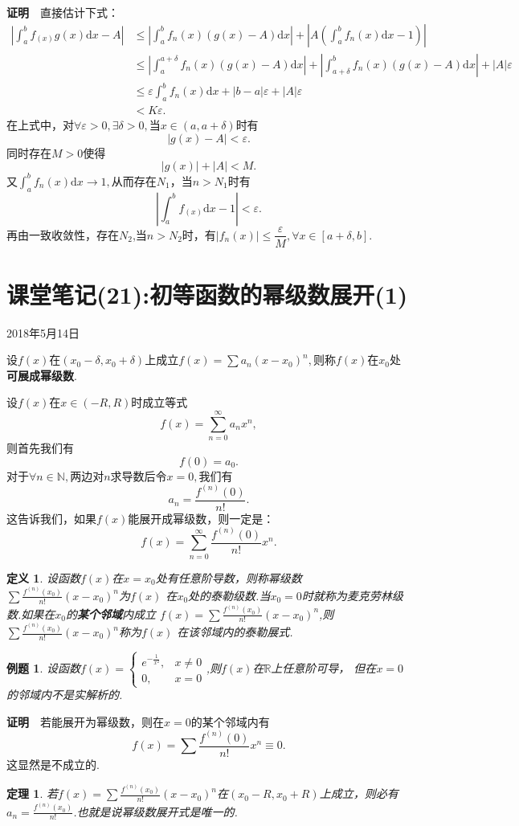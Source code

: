 \documentclass[UTF8]{article}
\newcommand{\R}{\mathbb{R}}
\newcommand{\dx}{\mathrm{d}x}
\newcommand{\zm}{\textbf{证明}$\quad$}
\newtheorem{thm}{\hspace{2em}定理}[section]
\newtheorem{dfn}{\hspace{2em}定义}[section]
\newtheorem{exa}{\hspace{2em}例题}[section]
\begin{document}
\zm 直接估计下式：
\begin{align*}
  \left|\int_a^bf_(x)g(x)\dx-A\right|&\le\left|\int_a^bf_n(x)(g(x)-A)\dx\right|+
  \left|A\left(\int_a^bf_n(x)\dx-1\right)\right|\\
  &\le\left|\int_a^{a+\delta}f_n(x)(g(x)-A)\dx\right|+\left|\int_{a+\delta}^bf_n(x)(g(x)-A)\dx\right|+|A|\varepsilon\\
  &\le\varepsilon\int_a^bf_n(x)\dx+|b-a|\varepsilon+|A|\varepsilon\\
  &<K\varepsilon.
\end{align*}
在上式中，对$\forall \varepsilon>0,\exists \delta>0,$当$x\in(a,a+\delta)$时有
$$|g(x)-A|<\varepsilon.$$
同时存在$M>0$使得
$$|g(x)|+|A|<M.$$
又$\int_a^bf_n(x)\dx\to 1,$从而存在$N_1$，当$n>N_1$时有
$$\left|\int_a^bf_(x)\dx-1\right|<\varepsilon.$$
再由一致收敛性，存在$N_2$,当$n>N_2$时，有$|f_n(x)|\le\dfrac{\varepsilon}{M},\forall x\in[a+\delta,b].$

\clearpage
\section{课堂笔记(21):初等函数的幂级数展开(1)}
\begin{center}
  2018年5月14日
\end{center}
  设$f(x)$在$(x_0-\delta,x_0+\delta)$上成立$f(x)=\sum a_n(x-x_0)^n,$则称$f(x)$在$x_0$处\textbf{可展成幂级数}.

  设$f(x)$在$x\in(-R,R)$时成立等式
  $$f(x)=\sum_{n=0}^\infty a_nx^n,$$
  则首先我们有
  $$f(0)=a_0.$$
  对于$\forall n\in\mathbb{N},$两边对$n$求导数后令$x=0,$我们有
  $$a_n=\frac{f^{(n)}(0)}{n!}.$$
  这告诉我们，如果$f(x)$能展开成幂级数，则一定是：
  $$f(x)=\sum_{n=0}^\infty\frac{f^{(n)}(0)}{n!}x^n.$$
  \begin{dfn}
    设函数$f(x)$在$x=x_0$处有任意阶导数，则称幂级数$\sum \frac{f^{(n)}(x_0)}{n!}(x-x_0)^n$为$f(x)$
    在$x_0$处的泰勒级数.当$x_0=0$时就称为麦克劳林级数.如果在$x_0$的\textbf{某个邻域}内成立
    $f(x)=\sum \frac{f^{(n)}(x_0)}{n!}(x-x_0)^n$,则$\sum \frac{f^{(n)}(x_0)}{n!}(x-x_0)^n$称为$f(x)$
    在该邻域内的泰勒展式.
  \end{dfn}
  \begin{exa}
    设函数$f(x)=\begin{cases} e^{-\frac{1}{x^2}},& x\ne0\\ 0,& x=0 \end{cases}$,则$f(x)$在$\R$上任意阶可导，
    但在$x=0$的邻域内不是实解析的.
  \end{exa}
  \zm 若能展开为幂级数，则在$x=0$的某个邻域内有
  $$f(x)=\sum \frac{f^{(n)}(0)}{n!}x^n\equiv 0.$$
  这显然是不成立的.
  \begin{thm}
    若$f(x)=\sum \frac{f^{(n)}(x_0)}{n!}(x-x_0)^n$在$(x_0-R,x_0+R)$上成立，则必有
    $a_n=\frac{f^{(n)}(x_0)}{n!}$.也就是说幂级数展开式是唯一的.
  \end{thm}
\end{document}
